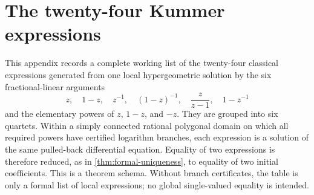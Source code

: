 \appendix
\section{The twenty-four Kummer expressions}\label{app:kummer24}

This appendix records a complete working list of the twenty-four classical
expressions generated from one local hypergeometric solution by the six
fractional-linear arguments
\[
 z,\quad 1-z,\quad z^{-1},\quad (1-z)^{-1},\quad
 \frac{z}{z-1},\quad 1-z^{-1}
\]
and the elementary powers of \(z\), \(1-z\), and \(-z\).  They are grouped
into six quartets.  Within a simply connected rational polygonal domain on
which all required powers have certified logarithm branches, each expression
is a solution of the same pulled-back differential equation.  Equality of two
expressions is therefore reduced, as in \cref{thm:formal-uniqueness}, to equality
of two initial coefficients.  This is a \StatusB{} theorem schema.  Without
branch certificates, the table is only a formal list of local expressions;
no global single-valued equality is intended.

